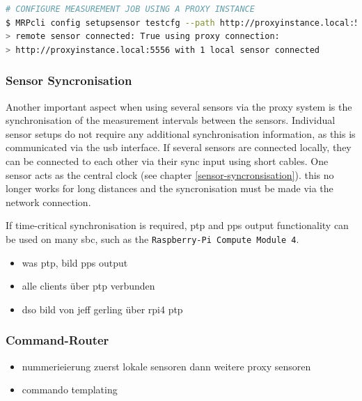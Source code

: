 \begin{lstlisting}[language=bash, caption={MRPcli usage example to connect with a network sensor}, label=lst:mrpcli_config_using_rpc]
# CONFIGURE MEASUREMENT JOB USING A PROXY INSTANCE
$ MRPcli config setupsensor testcfg --path http://proxyinstance.local:5556
> remote sensor connected: True using proxy connection:
> http://proxyinstance.local:5556 with 1 local sensor connected
\end{lstlisting}

\hypertarget{sensor-syncronisation}{%
\subsubsection{Sensor Syncronisation}\label{sensor-syncronisation}}

Another important aspect when using several sensors via the proxy system
is the synchronisation of the measurement intervals between the sensors.
Individual sensor setups do not require any additional synchronisation
information, as this is communicated via the \gls{usb} interface. If
several sensors are connected locally, they can be connected to each
other via their sync input using short cables. One sensor acts as the
central clock (see chapter \ref{sensor-syncronsisation}). this no longer
works for long distances and the syncronisation must be made via the
network connection.

If time-critical synchronisation is required, \gls{ptp} and \gls{pps}
output functionality can be used on many \gls{sbc}, such as the
\passthrough{\lstinline!Raspberry-Pi Compute Module 4!}.

\begin{itemize}
\tightlist
\item
  was ptp, bild pps output
\item
  alle clients über ptp verbunden
\item
  dso bild von jeff gerling über rpi4 ptp
\end{itemize}

\hypertarget{command-router}{%
\subsubsection{Command-Router}\label{command-router}}

\begin{itemize}
\tightlist
\item
  nummerieierung zuerst lokale sensoren dann weitere proxy sensoren
\item
  commando templating
\end{itemize}

